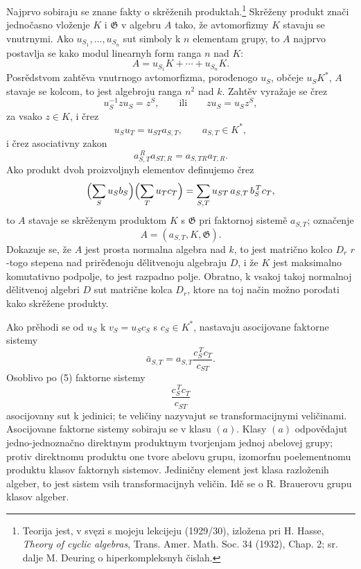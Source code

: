 \documentclass[11pt]{article}
\newcommand{\foreign}[1]{#1}
\providecommand{\Gg}{\mathfrak G}
\begin{document}
Najprvo sobiraju se znane fakty o skrěženih produktah.\footnote{Teorija jest, v svęzi s mojeju lekcijeju (1929/30), izložena pri H. Hasse, \foreign{\emph{Theory of cyclic algebras}}, Trans. Amer. Math. Soc. 34 (1932), Chap. 2; sr. dalje M. Deuring o hiperkompleksnyh čislah.} Skrěženy produkt znači jednočasno vloženje \(K\) i \(\Gg\) v algebru \(A\) tako, že avtomorfizmy \(K\) stavaju se vnutrnymi. Ako \(u_{S_1},\ldots,u_{S_n}\) sut simboly k \(n\) elementam grupy, to \(A\) najprvo postavlja se kako modul linearnyh form ranga \(n\) nad \(K\):
\[
        A=u_{S_1}K+\cdots+u_{S_n}K .                         \tag{1}
\]
Posrědstvom zahtěva vnutrnogo avtomorfizma, porođenogo \(u_S\), občeje \(u_S K^*\), \(A\) stavaje se kolcom, to jest algebroju ranga \(n^2\) nad \(k\). Zahtěv vyražaje se črez
\[
        u_S^{-1}zu_S=z^S,\qquad\text{ili}\qquad
        z u_S=u_S z^S,                                      \tag{2}
\]
za vsako \(z\in K\), i črez
\[
        u_Su_T=u_{ST}a_{S,T},\qquad a_{S,T}\in K^*,           \tag{3}
\]
i črez asociativny zakon
\[
        a_{S,T}^{\,R}a_{ST,R}=a_{S,TR}a_{T,R}.                \tag{4}
\]
Ako produkt dvoh proizvoljnyh elementov definujemo črez
\[
 \Bigl(\sum_S u_S b_S\Bigr)\Bigl(\sum_T u_T c_T\Bigr)
   =\sum_{S,T}u_{ST}\,a_{S,T}\,b_S^{\,T}c_T ,
\]
to \(A\) stavaje se skrěženym produktom \(K\) s \(\Gg\) pri faktornoj sistemě \(a_{S,T}\); označenje
\[
        A=(a_{S,T},K,\Gg).
\]
Dokazuje se, že \(A\) jest prosta normalna algebra nad \(k\), to jest matrično kolco \(D_r\) \(r\)-togo stepena nad prirěđenoju dělitvenoju algebraju \(D\), i že \(K\) jest maksimalno komutativno podpolje, to jest razpadno polje. Obratno, k vsakoj takoj normalnoj dělitvenoj algebri \(D\) sut matrične kolca \(D_r\), ktore na toj način možno porođati kako skrěžene produkty.

Ako prěhodi se od \(u_S\) k \(v_S=u_Sc_S\) s \(c_S\in K^*\), nastavaju asocijovane faktorne sistemy
\[
        \bar a_{S,T}
        =a_{S,T}\frac{c_S^{\,T}c_T}{c_{ST}} .                 \tag{5}
\]
Osoblivo po (5) faktorne sistemy
\[
        \frac{c_S^{\,T}c_T}{c_{ST}}
\]
asocijovany sut k jedinici; te veličiny nazyvajut se transformacijnymi veličinami. Asocijovane faktorne sistemy sobiraju se v klasu \((a)\). Klasy \((a)\) odpovědajut jedno-jednoznačno direktnym produktnym tvorjenjam jednoj abelovej grupy; protiv direktnomu produktu one tvore abelovu grupu, izomorfnu poelementnomu produktu klasov faktornyh sistemov. Jediničny element jest klasa razloženih algeber, to jest sistem vsih transformacijnyh veličin. Idě se o R. Brauerovu grupu klasov algeber.
\end{document}
